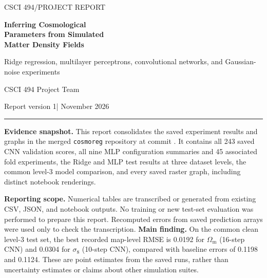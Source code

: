 \documentclass[11pt,a4paper]{article}
\newcommand{\Om}{\Omega_{\mathrm m}}
\newcommand{\sig}{\sigma_8}
\begin{document}
\raggedright
\begin{titlepage}
\vspace*{18mm}
{\Large\sffamily\color{ink} CSCI 494\quad /\quad PROJECT REPORT}\par
\vspace{12mm}
{\Huge\bfseries\color{ink} Inferring Cosmological\\Parameters from Simulated\\Matter Density Fields\par}
\vspace{7mm}
{\Large Ridge regression, multilayer perceptrons, convolutional networks, and Gaussian-noise experiments}\par
\vspace{14mm}
{\large CSCI 494 Project Team}\par
{\large Report version 1\quad | November 2026}\par
\vspace{12mm}
\hrule
\vspace{5mm}
\textbf{Evidence snapshot.} This report consolidates the saved experiment results and graphs in the merged \texttt{cosmoreg} repository at commit \texttt{\sourcecommit}. It contains all 243 saved CNN validation scores, all nine MLP configuration summaries and 45 associated fold experiments, the Ridge and MLP test results at three dataset levels, the common level-3 model comparison, and every saved raster graph, including distinct notebook renderings.

\textbf{Reporting scope.} Numerical tables are transcribed or generated from existing CSV, JSON, and notebook outputs. No training or new test-set evaluation was performed to prepare this report. Recomputed errors from saved prediction arrays were used only to check the transcription.
\vfill
\textbf{Main finding.} On the common clean level-3 test set, the best recorded map-level RMSE is 0.0192 for $\Om$ (16-step CNN) and 0.0304 for $\sig$ (10-step CNN), compared with baseline errors of 0.1198 and 0.1124. These are point estimates from the saved runs, rather than uncertainty estimates or claims about other simulation suites.
\end{titlepage}
\end{document}
